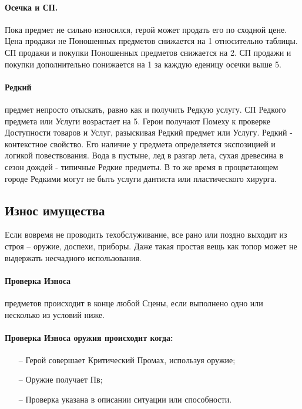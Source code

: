 \paragraph{Осечка и СП.} Пока предмет не сильно износился, герой может продать его по сходной цене. Цена продажи не Поношенных предметов снижается на 1 относительно таблицы.
\newline СП продажи и покупки Поношенных предметов снижается на 2.
\newline СП продажи и покупки дополнительно понижается на 1 за каждую еденицу осечки выше 5.
\paragraph{Редкий} предмет непросто отыскать, равно как и получить Редкую услугу. СП Редкого предмета или Услуги возрастает на 5. Герои получают Помеху к проверке Доступности товаров и Услуг, разыскивая Редкий предмет или Услугу. 
\newline Редкий - контекстное свойство. Его наличие у предмета определяется экспозицией и логикой повествования. Вода в пустыне, лед в разгар лета, сухая древесина в сезон дождей - типичные Редкие предметы. В то же время в процветающем городе Редкими могут не быть услуги дантиста или пластического хирурга.

\subsection{Износ имущества}
Если вовремя не проводить техобслуживание, все рано или поздно выходит из строя – оружие, доспехи, приборы. Даже такая простая вещь как топор может не выдержать несчадного использования.

\paragraph{Проверка Износа} предметов происходит в конце любой Сцены, если выполнено одно или несколько из условий ниже.
\paragraph{Проверка Износа оружия происходит когда:} 
\begin{itemize}
    \item[--] Герой совершает Критический Промах, используя оружие; 
    \item[--] Оружие получает Пв;
    \item[--] Проверка указана в описании ситуации или способности.
\end{itemize}
